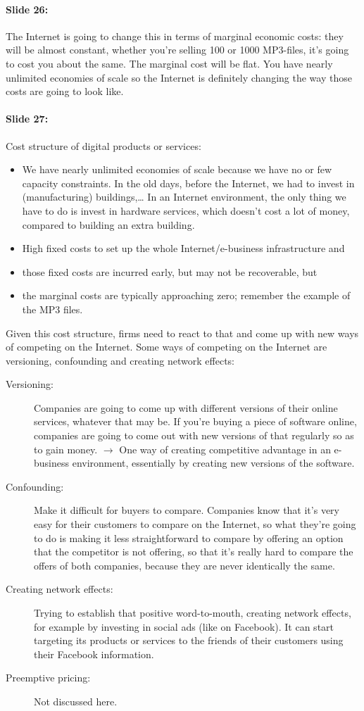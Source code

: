 \documentclass[10pt,a4paper]{report}
\begin{document}
\paragraph{Slide 26:}The Internet is going to change this in terms of marginal economic costs: they will be almost constant, whether you're selling 100 or 1000 MP3-files, it's going to cost you about the same. The marginal cost will be flat. You have nearly unlimited economies of scale so the Internet is definitely changing the way those costs are going to look like.

\paragraph{Slide 27:}Cost structure of digital products or services:
\begin{itemize}
\item We have nearly unlimited economies of scale because we have no or few capacity constraints. In the old days, before the Internet, we had to invest in (manufacturing) buildings,… In an Internet environment, the only thing we have to do is invest in hardware services, which doesn't cost a lot of money, compared to building an extra building.
\item High fixed costs to set up the whole Internet/e-business infrastructure and
\item those fixed costs are incurred early, but may not be recoverable, but
\item the marginal costs are typically approaching zero; remember the example of the MP3 files.
\end{itemize}
Given this cost structure, firms need to react to that and come up with new ways of competing on the Internet. Some ways of competing on the Internet are versioning, confounding and creating network effects:
\begin{description}
\item[Versioning:]Companies are going to come up with different versions of their online services, whatever that may be. If you're buying a piece of software online, companies are going to come out with new versions of that regularly so as to gain money. $\rightarrow$ One way of creating competitive advantage in an e-business environment, essentially by creating new versions of the software.
\item[Confounding:]Make it difficult for buyers to compare. Companies know that it's very easy for their customers to compare on the Internet, so what they're going to do is making it less straightforward to compare by offering an option that the competitor is not offering, so that it's really hard to compare the offers of both companies, because they are never identically the same.
\item[Creating network effects:]Trying to establish that positive word-to-mouth, creating network effects, for example by investing in social ads (like on Facebook). It can start targeting its products or services to the friends of their customers using their Facebook information.
\item[Preemptive pricing:]Not discussed here.
\end{description}
\end{document}
